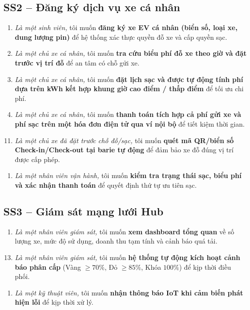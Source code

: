 \documentclass[12pt,a4paper]{report}
\begin{document}
\subsection{SS2 -- Đăng ký dịch vụ xe cá nhân}
\begin{enumerate}[nosep,label=\textbf{US-\arabic*:},start=8]
    \item \textit{Là một sinh viên,} tôi muốn \textbf{đăng ký xe EV cá nhân (biển số, loại xe, dung lượng pin)} để hệ thống xác thực quyền đỗ xe và cấp quyền sạc.
    \item \textit{Là một chủ xe cá nhân,} tôi muốn \textbf{tra cứu biểu phí đỗ xe theo giờ và đặt trước vị trí đỗ} để an tâm có chỗ gửi xe.
    \item \textit{Là một chủ xe cá nhân,} tôi muốn \textbf{đặt lịch sạc và được tự động tính phí dựa trên kWh kết hợp khung giờ cao điểm / thấp điểm} để tối ưu chi phí.
    \item \textit{Là một chủ xe cá nhân,} tôi muốn \textbf{thanh toán tích hợp cả phí gửi xe và phí sạc trên một hóa đơn điện tử qua ví nội bộ} để tiết kiệm thời gian.
\end{enumerate}
\begin{enumerate}[nosep,label=\textbf{US-\arabic*b:}]
    \setcounter{enumi}{10}
    \item \textit{Là một chủ xe đã đặt trước chỗ đỗ/sạc,} tôi muốn \textbf{quét mã QR/biển số Check-in/Check-out tại barie tự động} để đảm bảo xe đỗ đúng vị trí được cấp phép.
\end{enumerate}
\begin{enumerate}[nosep,label=\textbf{US-\arabic*:},start=12]
    \item \textit{Là một nhân viên vận hành,} tôi muốn \textbf{kiểm tra trạng thái sạc, biểu phí và xác nhận thanh toán} để quyết định thứ tự ưu tiên sạc.
\end{enumerate}

\subsection{SS3 -- Giám sát mạng lưới Hub}
\begin{enumerate}[nosep,label=\textbf{US-\arabic*:},start=13]
    \item \textit{Là một nhân viên giám sát,} tôi muốn \textbf{xem dashboard tổng quan} về số lượng xe, mức độ sử dụng, doanh thu tạm tính và cảnh báo quá tải.
\end{enumerate}
\begin{enumerate}[nosep,label=\textbf{US-\arabic*b:}]
    \setcounter{enumi}{12}
    \item \textit{Là một nhân viên giám sát,} tôi muốn \textbf{hệ thống tự động kích hoạt cảnh báo phân cấp} (Vàng $\ge 70\%$, Đỏ $\ge 85\%$, Khóa $100\%$) để kịp thời điều phối.
\end{enumerate}
\begin{enumerate}[nosep,label=\textbf{US-\arabic*:},start=14]
    \item \textit{Là một kỹ thuật viên,} tôi muốn \textbf{nhận thông báo IoT khi cảm biến phát hiện lỗi} để kịp thời xử lý.
\end{enumerate}
\end{document}
